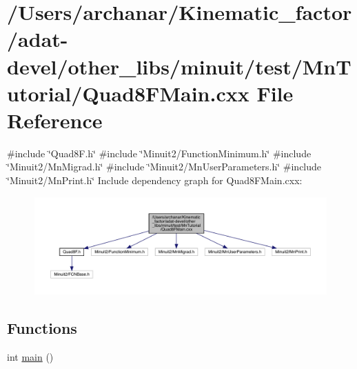 \hypertarget{adat-devel_2other__libs_2minuit_2test_2MnTutorial_2Quad8FMain_8cxx}{}\section{/\+Users/archanar/\+Kinematic\+\_\+factor/adat-\/devel/other\+\_\+libs/minuit/test/\+Mn\+Tutorial/\+Quad8\+F\+Main.cxx File Reference}
\label{adat-devel_2other__libs_2minuit_2test_2MnTutorial_2Quad8FMain_8cxx}
{\ttfamily \#include \char`\"{}Quad8\+F.\+h\char`\"{}}\newline
{\ttfamily \#include \char`\"{}Minuit2/\+Function\+Minimum.\+h\char`\"{}}\newline
{\ttfamily \#include \char`\"{}Minuit2/\+Mn\+Migrad.\+h\char`\"{}}\newline
{\ttfamily \#include \char`\"{}Minuit2/\+Mn\+User\+Parameters.\+h\char`\"{}}\newline
{\ttfamily \#include \char`\"{}Minuit2/\+Mn\+Print.\+h\char`\"{}}\newline
Include dependency graph for Quad8\+F\+Main.\+cxx\+:
\nopagebreak
\begin{figure}[H]
\begin{center}
\leavevmode
\includegraphics[width=350pt]{dd/ded/adat-devel_2other__libs_2minuit_2test_2MnTutorial_2Quad8FMain_8cxx__incl}
\end{center}
\end{figure}
\subsection*{Functions}
\begin{DoxyCompactItemize}
\item 
int \mbox{\hyperlink{adat-devel_2other__libs_2minuit_2test_2MnTutorial_2Quad8FMain_8cxx_ae66f6b31b5ad750f1fe042a706a4e3d4}{main}} ()
\end{DoxyCompactItemize}


